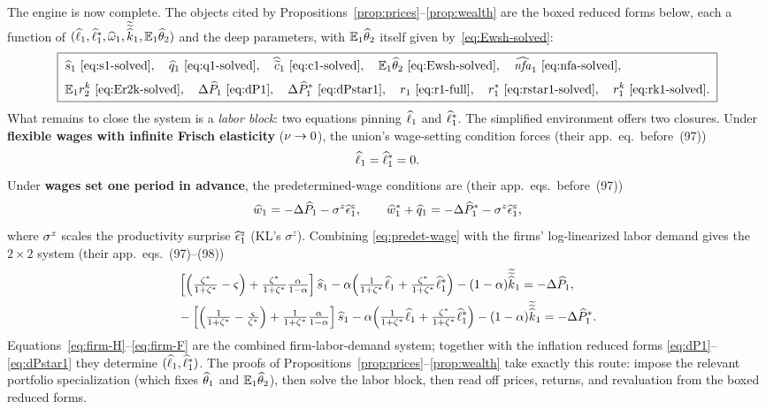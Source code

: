 The engine is now complete. The objects cited by
Propositions~\ref{prop:prices}--\ref{prop:wealth} are the boxed reduced forms
below, each a function of
$(\widehat{\ell}_1,\widehat{\ell}^{*}_1,\widehat{\omega}_1,\widetilde{\widetilde{\widehat{k}}}_1,
\mathbb{E}_1\widehat{\theta}_2)$ and the deep parameters, with $\mathbb{E}_1\widehat{\theta}_2$ itself
given by~\eqref{eq:Ewsh-solved}:
\[
\boxed{\;
\begin{aligned}
&\widehat{s}_1 \text{ \eqref{eq:s1-solved}},\quad
\widehat{q}_1 \text{ \eqref{eq:q1-solved}},\quad
\widehat{\widetilde{c}}_1 \text{ \eqref{eq:c1-solved}},\quad
\mathbb{E}_1\widehat{\theta}_2 \text{ \eqref{eq:Ewsh-solved}},\quad
\widehat{\mathit{nfa}}_1 \text{ \eqref{eq:nfa-solved}},\\[2pt]
&\mathbb{E}_1r^{k}_2 \text{ \eqref{eq:Er2k-solved}},\quad
\Delta\widehat{P}_1 \text{ \eqref{eq:dP1}},\quad
\Delta\widehat{P}^{*}_1 \text{ \eqref{eq:dPstar1}},\quad
r_1 \text{ \eqref{eq:r1-full}},\quad
r^{*}_1 \text{ \eqref{eq:rstar1-solved}},\quad
r^{k}_1 \text{ \eqref{eq:rk1-solved}}.
\end{aligned}\;}
\]
What remains to close the system is a \emph{labor block}: two equations pinning
$\widehat{\ell}_1$ and $\widehat{\ell}^{*}_1$. The simplified environment offers two
closures. Under \textbf{flexible wages with infinite Frisch elasticity}
($\nu\to0$), the union's wage-setting condition forces (their app.~eq.\
before~(97))
\begin{equation}
\widehat{\ell}_1 = \widehat{\ell}^{*}_1 = 0. \label{eq:flex-labor}
\end{equation}
Under \textbf{wages set one period in advance}, the predetermined-wage conditions
are (their app.~eqs.\ before~(97))
\begin{equation}
\widehat{w}_1 = -\Delta\widehat{P}_1 - \sigma^z\widehat{\epsilon}^z_1, \qquad
\widehat{w}^{*}_1 + \widehat{q}_1 = -\Delta\widehat{P}^{*}_1 - \sigma^z\widehat{\epsilon}^z_1, \label{eq:predet-wage}
\end{equation}
where $\sigma^z$ scales the productivity surprise $\widehat{\epsilon}^z_1$ (KL's
$\sigma^z$). Combining \eqref{eq:predet-wage} with the firms' log-linearized
labor demand gives the $2\times2$ system (their app.~eqs.~(97)--(98))
\begin{align}
&\left[\Bigl(\tfrac{\zeta^{*}}{1+\zeta^{*}}-\varsigma\Bigr)+\tfrac{\zeta^{*}}{1+\zeta^{*}}\tfrac{\alpha}{1-\alpha}\right]\widehat{s}_1
-\alpha\Bigl(\tfrac{1}{1+\zeta^{*}}\widehat{\ell}_1+\tfrac{\zeta^{*}}{1+\zeta^{*}}\widehat{\ell}^{*}_1\Bigr)
-(1-\alpha)\widetilde{\widetilde{\widehat{k}}}_1 = -\Delta\widehat{P}_1, \label{eq:firm-H}\\
&-\left[\Bigl(\tfrac{1}{1+\zeta^{*}}-\tfrac{\varsigma}{\zeta^{*}}\Bigr)+\tfrac{1}{1+\zeta^{*}}\tfrac{\alpha}{1-\alpha}\right]\widehat{s}_1
-\alpha\Bigl(\tfrac{1}{1+\zeta^{*}}\widehat{\ell}_1+\tfrac{\zeta^{*}}{1+\zeta^{*}}\widehat{\ell}^{*}_1\Bigr)
-(1-\alpha)\widetilde{\widetilde{\widehat{k}}}_1 = -\Delta\widehat{P}^{*}_1. \label{eq:firm-F}
\end{align}
Equations~\eqref{eq:firm-H}--\eqref{eq:firm-F} are the combined firm-labor-demand
system; together with the inflation reduced forms \eqref{eq:dP1}--\eqref{eq:dPstar1}
they determine $(\widehat{\ell}_1,\widehat{\ell}^{*}_1)$. The proofs of
Propositions~\ref{prop:prices}--\ref{prop:wealth} take exactly this route: impose
the relevant portfolio specialization (which fixes $\widehat{\theta}_1$ and
$\mathbb{E}_1\widehat{\theta}_2$), then solve the labor block, then read off prices, returns,
and revaluation from the boxed reduced forms.
